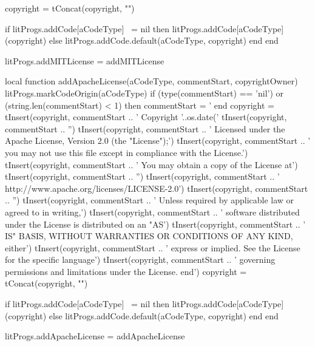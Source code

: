   copyright = tConcat(copyright, "\n")

  if litProgs.addCode[aCodeType] ~= nil then
    litProgs.addCode[aCodeType](copyright)
  else
    litProgs.addCode.default(aCodeType, copyright)
  end
end

litProgs.addMITLicense = addMITLicense

local function addApacheLicense(aCodeType, commentStart, copyrightOwner)
  litProgs.markCodeOrigin(aCodeType)
  if (type(commentStart) == 'nil') or (string.len(commentStart) < 1) then
    commentStart = '%
  end
  copyright = { }
  tInsert(copyright, commentStart ..
    ' Copyright '..os.date('%
  tInsert(copyright,  commentStart .. 
    '')
  tInsert(copyright, commentStart ..
    ' Licensed under the Apache License, Version 2.0 (the "License");')
  tInsert(copyright, commentStart ..
    ' you may not use this file except in compliance with the License.')
  tInsert(copyright, commentStart ..
    ' You may obtain a copy of the License at')
  tInsert(copyright, commentStart ..
    '')
  tInsert(copyright, commentStart ..
    '    http://www.apache.org/licenses/LICENSE-2.0')
  tInsert(copyright, commentStart ..
    '')
  tInsert(copyright, commentStart ..
    ' Unless required by applicable law or agreed to in writing,')
  tInsert(copyright, commentStart ..
    ' software distributed under the License is distributed on an "AS')
  tInsert(copyright, commentStart ..
    ' IS" BASIS, WITHOUT WARRANTIES OR CONDITIONS OF ANY KIND, either')
  tInsert(copyright, commentStart ..
    ' express or implied. See the License for the specific language')
  tInsert(copyright, commentStart ..
    ' governing permissions and limitations under the License. end')
  copyright = tConcat(copyright, "\n")

  if litProgs.addCode[aCodeType] ~= nil then
    litProgs.addCode[aCodeType](copyright)
  else
    litProgs.addCode.default(aCodeType, copyright)
  end
end

litProgs.addApacheLicense = addApacheLicense
\stopLuaCode

\startMkIVCode
\unexpanded\def\setLitProgsOriginMarker{
  \dotripleempty\doSetLitProgsOriginMarker%
}

\unexpanded{}

